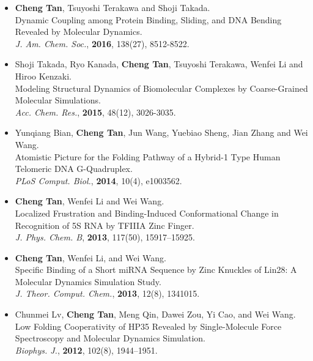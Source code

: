 

\begin{cventries}

\begin{itemize}
\item \textbf{Cheng Tan}, Tsuyoshi Terakawa and Shoji Takada. \\
  Dynamic Coupling among Protein Binding, Sliding, and DNA Bending Revealed by
  Molecular Dynamics. \\
  \textit{J. Am. Chem. Soc.}, \textbf{2016}, 138(27), 8512-8522.
\item Shoji Takada, Ryo Kanada, \textbf{Cheng Tan}, Tsuyoshi Terakawa, Wenfei
  Li and Hiroo Kenzaki. \\
  Modeling Structural Dynamics of Biomolecular Complexes by Coarse-Grained
  Molecular Simulations. \\
  \textit{Acc. Chem. Res.}, \textbf{2015}, 48(12), 3026-3035.
\item Yunqiang Bian, \textbf{Cheng Tan}, Jun Wang, Yuebiao Sheng, Jian Zhang and
  Wei Wang. \\
  Atomistic Picture for the Folding Pathway of a Hybrid-1 Type Human Telomeric
  DNA G-Quadruplex. \\
  \textit{PLoS Comput. Biol.}, \textbf{2014}, 10(4), e1003562.
\item \textbf{Cheng Tan}, Wenfei Li and Wei Wang.\\
  Localized Frustration and Binding-Induced Conformational Change in Recognition
  of 5S RNA by TFIIIA Zinc Finger. \\
  \textit{J. Phys. Chem. B}, \textbf{2013}, 117(50), 15917--15925.
\item \textbf{Cheng Tan}, Wenfei Li, and Wei Wang.\\
  Specific Binding of a Short miRNA Sequence by Zinc Knuckles of Lin28: A
  Molecular Dynamics Simulation Study. \\
  \textit{J. Theor. Comput. Chem.}, \textbf{2013}, 12(8), 1341015.
\item Chunmei Lv, \textbf{Cheng Tan}, Meng Qin, Dawei Zou, Yi Cao, and Wei Wang.\\
  Low Folding Cooperativity of HP35 Revealed by Single-Molecule Force
  Spectroscopy and Molecular Dynamics Simulation. \\
  \textit{Biophys. J.}, \textbf{2012}, 102(8), 1944--1951.
\end{itemize}

\end{cventries}
